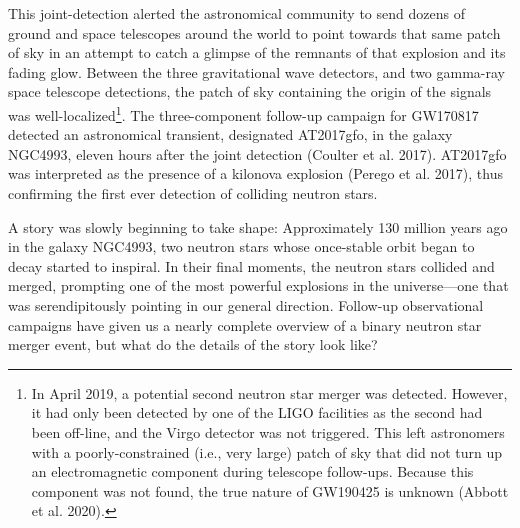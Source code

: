 \documentclass[1.5,11pt]{beavtex}
\begin{document}
This joint-detection alerted the astronomical community to send dozens of ground and space telescopes around the world to point towards that same patch of sky in an attempt to catch a glimpse of the remnants of that explosion and its fading glow. Between the three gravitational wave detectors, and two gamma-ray space telescope detections, the patch of sky containing the origin of the signals was well-localized\footnote{\selectfont In April 2019, a potential second neutron star merger was detected. However, it had only been detected by one of the LIGO facilities as the second had been off-line, and the Virgo detector was not triggered. This left astronomers with a poorly-constrained (i.e., very large) patch of sky that did not turn up an electromagnetic component during telescope follow-ups. Because this component was not found, the true nature of GW190425 is unknown (Abbott et al. 2020).}. The three-component follow-up campaign for GW170817 detected an astronomical transient, designated AT2017gfo, in the galaxy NGC4993, eleven hours after the joint detection (Coulter et al. 2017). AT2017gfo was interpreted as the presence of a kilonova explosion (Perego et al. 2017), thus confirming the first ever detection of colliding neutron stars.

A story was slowly beginning to take shape: Approximately 130 million years ago in the galaxy NGC4993, two neutron stars whose once-stable orbit began to decay started to inspiral. In their final moments, the neutron stars collided and merged, prompting one of the most powerful explosions in the universe---one that was serendipitously pointing in our general direction. Follow-up observational campaigns have given us a nearly complete overview of a binary neutron star merger event, but what do the details of the story look like?
\end{document}
